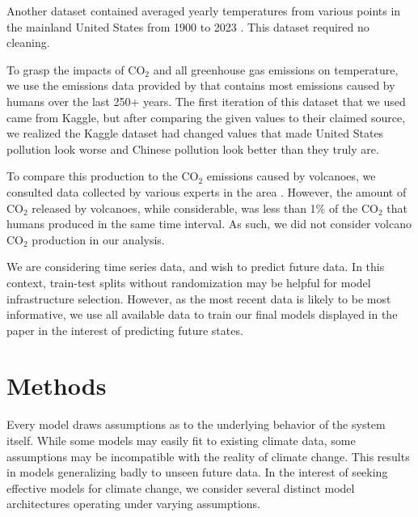 \documentclass[11pt]{amsart}
\begin{document}
Another dataset contained averaged yearly temperatures from various points in the mainland United States from 1900 to 2023 \cite{nguyen2023avgtemp}. This dataset required no cleaning.

To grasp the impacts of CO$_2$ and all greenhouse gas emissions on temperature, we use the emissions data provided by \cite{co2_ghg_kaggle} that contains most emissions caused by humans over the last 250+ years. The first iteration of this dataset that we used came from Kaggle, but after comparing the given values to their claimed source, we realized the Kaggle dataset had changed values that made United States pollution look worse and Chinese pollution look better than they truly are.

To compare this production to the CO$_2$ emissions caused by volcanoes, we consulted data collected by various experts in the area \cite{fischer2019emissions}. However, the amount of CO$_2$ released by volcanoes, while considerable, was less than 1\% of the CO$_2$ that humans produced in the same time interval. As such, we did not consider volcano CO$_2$ production in our analysis.

We are considering time series data, and wish to predict future data.
In this context, train-test splits without randomization may be helpful for model infrastructure selection. 
However, as the most recent data is likely to be most informative, we use all available data to train our final models displayed in the paper in the interest of predicting future states.


\section{Methods} 


Every model draws assumptions as to the underlying behavior of the system itself. 
While some models may easily fit to existing climate data, some assumptions may be incompatible with the reality of climate change.
This results in models generalizing badly to unseen future data.
In the interest of seeking effective models for climate change, we consider several distinct model architectures operating under varying assumptions.
\end{document}
